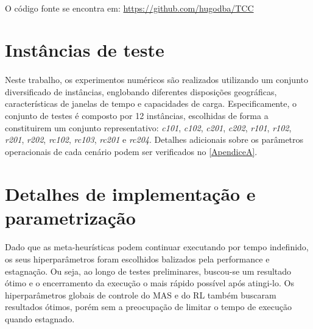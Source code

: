 \paragraph{} O código fonte se encontra em: \href{https://github.com/hugodba/TCC}{https://github.com/hugodba/TCC}


\section{Instâncias de teste}
\label{sec:instancias}

\paragraph{}Neste trabalho, os experimentos numéricos são realizados utilizando um conjunto diversificado de instâncias, englobando diferentes disposições geográficas, características de janelas de tempo e capacidades de carga. Especificamente, o conjunto de testes é composto por 12 instâncias, escolhidas de forma a constituirem um conjunto representativo: \textit{c101}, \textit{c102}, \textit{c201}, \textit{c202}, \textit{r101}, \textit{r102}, \textit{r201}, \textit{r202}, \textit{rc102}, \textit{rc103}, \textit{rc201} e \textit{rc204}. Detalhes adicionais sobre os parâmetros operacionais de cada cenário podem ser verificados no \autoref{ApendiceA}.

\section{Detalhes de implementação e parametrização}
\label{sec:implementacao}

\paragraph{} Dado que as meta-heurísticas podem continuar executando por tempo indefinido, os seus hiperparâmetros foram escolhidos balizados pela performance e estagnação. Ou seja, ao longo de testes preliminares, buscou-se um resultado ótimo e o encerramento da execução o mais rápido possível após atingi-lo. Os hiperparâmetros globais de controle do MAS e do RL também buscaram resultados ótimos, porém sem a preocupação de limitar o tempo de execução quando estagnado.

